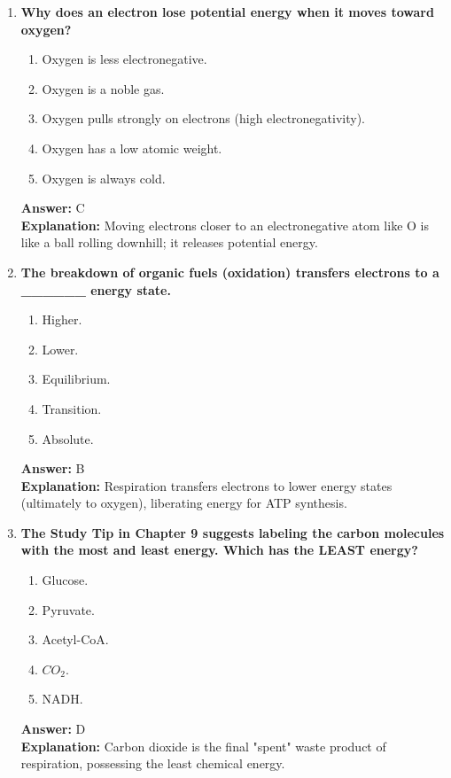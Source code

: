 \documentclass[11pt, a4paper]{article}
\begin{document}
\begin{enumerate}[leftmargin=*, label=\arabic*.]
\item \textbf{Why does an electron lose potential energy when it moves toward oxygen?}
\begin{enumerate}[label=\Alph*.]
    \item Oxygen is less electronegative.
    \item Oxygen is a noble gas.
    \item Oxygen pulls strongly on electrons (high electronegativity).
    \item Oxygen has a low atomic weight.
    \item Oxygen is always cold.
\end{enumerate}
\textbf{Answer:} C \\
\textbf{Explanation:} Moving electrons closer to an electronegative atom like O is like a ball rolling downhill; it releases potential energy.

\item \textbf{The breakdown of organic fuels (oxidation) transfers electrons to a \_\_\_\_\_\_ energy state.}
\begin{enumerate}[label=\Alph*.]
    \item Higher.
    \item Lower.
    \item Equilibrium.
    \item Transition.
    \item Absolute.
\end{enumerate}
\textbf{Answer:} B \\
\textbf{Explanation:} Respiration transfers electrons to lower energy states (ultimately to oxygen), liberating energy for ATP synthesis.

\item \textbf{The Study Tip in Chapter 9 suggests labeling the carbon molecules with the most and least energy. Which has the LEAST energy?}
\begin{enumerate}[label=\Alph*.]
    \item Glucose.
    \item Pyruvate.
    \item Acetyl-CoA.
    \item $CO_2$.
    \item NADH.
\end{enumerate}
\textbf{Answer:} D \\
\textbf{Explanation:} Carbon dioxide is the final "spent" waste product of respiration, possessing the least chemical energy.


\end{enumerate}
\end{document}
